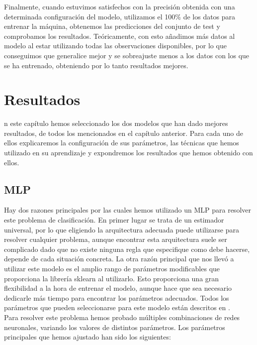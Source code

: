 \documentclass[journal,twoside]{JoPhA}
\begin{document}
Finalmente, cuando estuvimos satisfechos con la precisión obtenida con una determinada configuración del modelo, utilizamos el 100\% de los datos para entrenar la máquina, obtenemos las predicciones del conjunto de test y comprobamos los resultados. Teóricamente, con esto añadimos más datos al modelo al estar utilizando todas las observaciones disponibles, por lo que conseguimos que generalice mejor y se sobreajuste menos a los datos con los que se ha entrenado, obteniendo por lo tanto resultados mejores. \\


\section{Resultados}
n este capítulo hemos seleccionado los dos modelos que han dado mejores resultados, de todos los mencionados en el capítulo anterior. Para cada uno de ellos explicaremos la configuración de sus parámetros, las técnicas que hemos utilizado en su aprendizaje y expondremos los resultados que hemos obtenido con ellos.


\subsection{MLP}
Hay dos razones principales por las cuales hemos utilizado un MLP para resolver este problema de clasificación. En primer lugar se trata de un estimador universal, por lo que eligiendo la arquitectura adecuada puede utilizarse para resolver cualquier problema, aunque encontrar esta arquitectura suele ser complicado dado que no existe ninguna regla que especifique como debe hacerse, depende de cada situación concreta. La otra razón principal que nos llevó a utilizar este modelo es el amplio rango de parámetros modificables que proporciona la librería sklearn al utilizarlo. Esto proporciona una gran flexibilidad a la hora de entrenar el modelo, aunque hace que sea necesario dedicarle más tiempo para encontrar los parámetros adecuados. Todos los parámetros que pueden seleccionarse para este modelo están descritos en \cite{mlp}. \\

Para resolver este problema hemos probado múltiples combinaciones de redes neuronales, variando los valores de distintos parámetros. Los parámetros principales que hemos ajustado han sido los siguientes: \\
\end{document}
